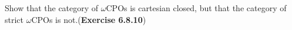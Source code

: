 Show that the category of $\omega$CPOs is cartesian closed, but that the category of strict $\omega$CPOs is not.(\textbf{Exercise 6.8.10})